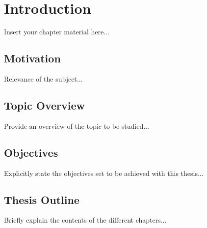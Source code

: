 \chapter{Introduction}
\label{chapter:introduction}

Insert your chapter material here...

\section{Motivation}
\label{section:motivation}

Relevance of the subject...


\section{Topic Overview}
\label{section:overview}

Provide an overview of the topic to be studied...


\section{Objectives}
\label{section:objectives}

Explicitly state the objectives set to be achieved with this thesis...


\section{Thesis Outline}
\label{section:outline}

Briefly explain the contents of the different chapters...


